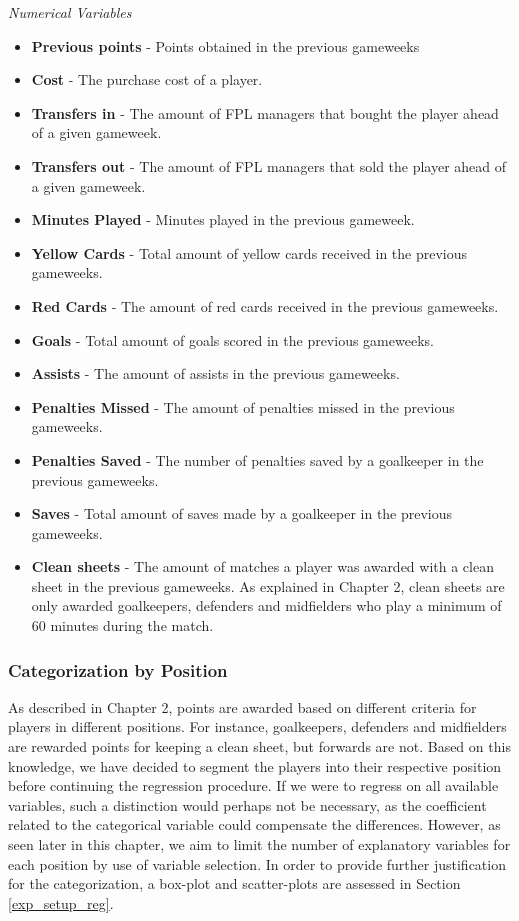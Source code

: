 \textit{Numerical Variables}
\newpar
\begin{itemize}
    \item \textbf{Previous points} - Points obtained in the previous gameweeks
    \item \textbf{Cost} - The purchase cost of a player.
    \item \textbf{Transfers in} - The amount of FPL managers that bought the player ahead of a given gameweek.
    \item \textbf{Transfers out} - The amount of FPL managers that sold the player ahead of a given gameweek.
    \item \textbf{Minutes Played} - Minutes played in the previous gameweek.
    \item \textbf{Yellow Cards} - Total amount of yellow cards received in the previous gameweeks.
    \item \textbf{Red Cards} - The amount of red cards received in the previous gameweeks.
    \item \textbf{Goals} - Total amount of goals scored in the previous gameweeks.
    \item \textbf{Assists} - The amount of assists in the previous gameweeks.
    \item \textbf{Penalties Missed} - The amount of penalties missed in the previous gameweeks.
    \item \textbf{Penalties Saved} - The number of penalties saved by a goalkeeper in the previous gameweeks.
    \item \textbf{Saves} - Total amount of saves made by a goalkeeper in the previous gameweeks.
    \item \textbf{Clean sheets} - The amount of matches a player was awarded with a clean sheet in the previous gameweeks. As explained in Chapter 2, clean sheets are only awarded goalkeepers, defenders and midfielders who play a minimum of 60 minutes during the match.
    
\end{itemize}

\subsubsection{Categorization by Position}


As described in Chapter 2, points are awarded based on different criteria for players in different positions. For instance, goalkeepers, defenders and midfielders are rewarded points for keeping a clean sheet, but forwards are not. Based on this knowledge, we have decided to segment the players into their respective position before continuing the regression procedure. If we were to regress on all available variables, such a distinction would perhaps not be necessary, as the coefficient related to the categorical variable could compensate the differences. However, as seen later in this chapter, we aim to limit the number of explanatory variables for each position by use of variable selection. In order to provide further justification for the categorization, a box-plot and scatter-plots are assessed in Section \ref{exp_setup_reg}.

